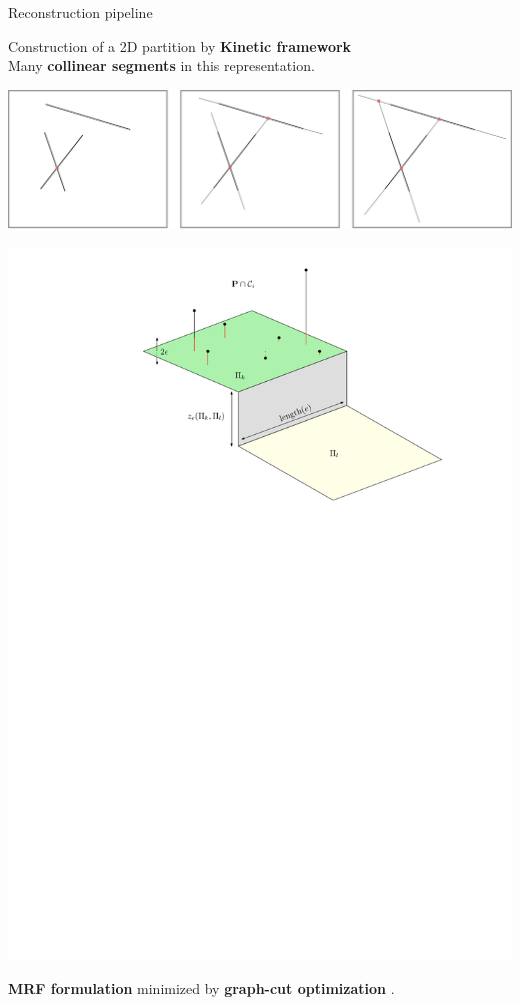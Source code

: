 \begin{frame}{Reconstruction pipeline}
	\begin{minipage}{0.5\linewidth}
		Construction of a 2D partition by \textbf{Kinetic framework} \cite{bauchet_KIPPIKIneticPolygonal_2018}\\
		Many \textbf{collinear segments} in this representation.	
	\end{minipage}
	\hfill
	\begin{minipage}{0.45\linewidth}
		\centering
		\includegraphics[width=\linewidth]{kinetic}
	\end{minipage}

	\vspace{0.25cm}

	\begin{minipage}{0.3\linewidth}
		\centering
		\includegraphics[width=\linewidth]{lift_terms}
	\end{minipage}
	\hfill
	\begin{minipage}{0.6\linewidth}
		\textbf{MRF formulation} minimized by \textbf{graph-cut optimization} \cite{boykov_FastApproximateEnergy_2001}.
	\end{minipage}
\end{frame}

